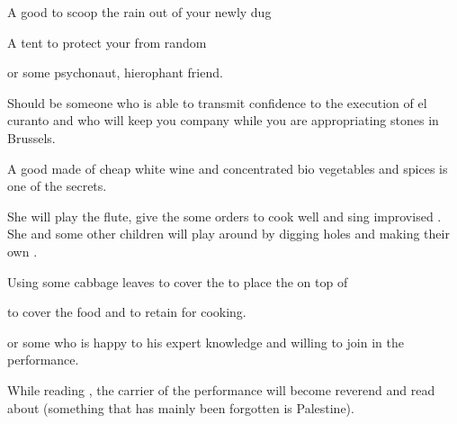 {{ {A good  to scoop the rain out of your newly dug }

 {A tent to protect your  from random }

 { or some psychonaut, hierophant friend.}

Should be someone who is able to transmit confidence to the execution of el curanto and
who will keep you company while you are appropriating stones in
Brussels.


\startitemize[3,unpacked]

\item{A good  made of cheap white wine and concentrated bio
vegetables and spices is one of the secrets.}

\stopitemize



She will play the flute, give the  some orders to cook well and sing improvised
. She and some other children will play around by digging holes
and making their own .


 {}

 {Using some cabbage leaves to cover the  to place
the  on top of} 

 { to cover the food and to retain  for
cooking.}

 { or some  who is happy to  his expert
knowledge and willing to join in the performance.}


While reading , the carrier of the performance will become reverend  and read
about  (something that has mainly been forgotten is Palestine).

}}
